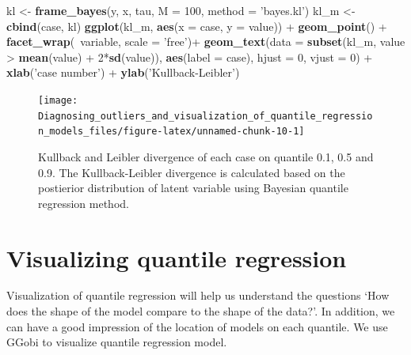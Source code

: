 \documentclass[11pt,a4paper,]{article}
\newenvironment{Shaded}{\begin{snugshade}}{\end{snugshade}}
\newcommand{\KeywordTok}[1]{\textcolor[rgb]{0.13,0.29,0.53}{\textbf{{#1}}}}
\newcommand{\DataTypeTok}[1]{\textcolor[rgb]{0.13,0.29,0.53}{{#1}}}
\newcommand{\DecValTok}[1]{\textcolor[rgb]{0.00,0.00,0.81}{{#1}}}
\newcommand{\StringTok}[1]{\textcolor[rgb]{0.31,0.60,0.02}{{#1}}}
\newcommand{\NormalTok}[1]{{#1}}
\theoremstyle{definition}
\theoremstyle{definition}
\theoremstyle{remark}
\begin{document}
\begin{Shaded}
\begin{Highlighting}[]
\NormalTok{kl <-}\StringTok{ }\KeywordTok{frame_bayes}\NormalTok{(y, x, tau, }\DataTypeTok{M =} \DecValTok{100}\NormalTok{,}
                  \DataTypeTok{method =} \StringTok{'bayes.kl'}\NormalTok{)}
\NormalTok{kl_m <-}\StringTok{ }\KeywordTok{cbind}\NormalTok{(case, kl)}
\KeywordTok{ggplot}\NormalTok{(kl_m, }\KeywordTok{aes}\NormalTok{(}\DataTypeTok{x =} \NormalTok{case, }\DataTypeTok{y =} \NormalTok{value)) +}
\StringTok{  }\KeywordTok{geom_point}\NormalTok{() +}
\StringTok{  }\KeywordTok{facet_wrap}\NormalTok{(~variable, }\DataTypeTok{scale =} \StringTok{'free'}\NormalTok{)+}
\StringTok{  }\KeywordTok{geom_text}\NormalTok{(}\DataTypeTok{data =} \KeywordTok{subset}\NormalTok{(kl_m, value >}\StringTok{ }\KeywordTok{mean}\NormalTok{(value) +}\StringTok{ }\DecValTok{2}\NormalTok{*}\KeywordTok{sd}\NormalTok{(value)),}
            \KeywordTok{aes}\NormalTok{(}\DataTypeTok{label =} \NormalTok{case), }\DataTypeTok{hjust =} \DecValTok{0}\NormalTok{, }\DataTypeTok{vjust =} \DecValTok{0}\NormalTok{) +}
\StringTok{  }\KeywordTok{xlab}\NormalTok{(}\StringTok{'case number'}\NormalTok{) +}
\StringTok{  }\KeywordTok{ylab}\NormalTok{(}\StringTok{'Kullback-Leibler'}\NormalTok{)}
\end{Highlighting}
\end{Shaded}

\begin{figure}

{\centering \texttt{[image: Diagnosing\_outliers\_and\_visualization\_of\_quantile\_regression\_models\_files/figure-latex/unnamed-chunk-10-1]} 

}

\caption{Kullback and Leibler divergence of each case on quantile 0.1, 0.5 and 0.9. The Kullback-Leibler divergence is calculated based on the postierior distribution of latent variable using Bayesian quantile regression method.}\label{fig:unnamed-chunk-10}
\end{figure}

\section{Visualizing quantile
regression}\label{visualizing-quantile-regression}

Visualization of quantile regression will help us understand the
questions `How does the shape of the model compare to the shape of the
data?'. In addition, we can have a good impression of the location of
models on each quantile. We use GGobi to visualize quantile regression
model.
\end{document}
